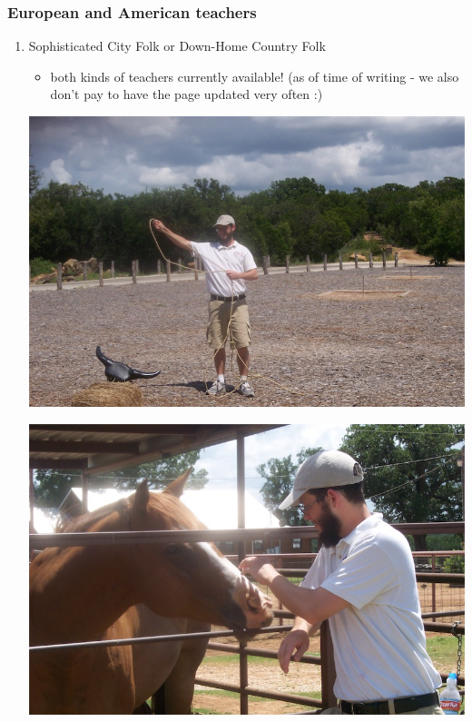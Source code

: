 \documentclass[11pt]{article}
\begin{document}
\subsubsection{European and American teachers}
\label{sec:org2468bf4}
\begin{enumerate}
\item Sophisticated City Folk or Down-Home Country Folk
\label{sec:org41a79b7}
\begin{itemize}
\item both kinds of teachers currently available! (as of time of writing - we also don't pay to have the page updated very often :)
\end{itemize}

\begin{center}
\includegraphics[width=.9\linewidth]{./images/home1.jpg}
\end{center}
\begin{center}
\includegraphics[width=.9\linewidth]{./images/home2.jpg}
\end{center}
\end{enumerate}
\end{document}
